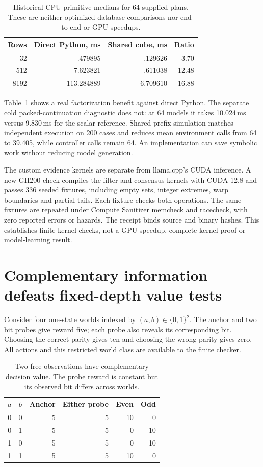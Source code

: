 \documentclass[10pt,twocolumn]{article}
\begin{document}
\begin{table}[t]
\centering\small
\begin{tabular}{rrrr}
\toprule
Rows & Direct Python, ms & Shared cube, ms & Ratio\\
\midrule
32 & .479895 & .129626 & 3.70\\
512 & 7.623821 & .611038 & 12.48\\
8192 & 113.284889 & 6.709610 & 16.88\\
\bottomrule
\end{tabular}
\caption{Historical CPU primitive medians for 64 supplied plans. These are
neither optimized-database comparisons nor end-to-end or GPU speedups.}
\label{tab:cube}
\end{table}

Table~\ref{tab:cube} shows a real factorization benefit against direct Python.
The separate cold packed-continuation diagnostic does not: at 64 models it
takes 10.024\,ms versus 9.830\,ms for the scalar reference. Shared-prefix
simulation matches independent execution on 200 cases and reduces mean
environment calls from 64 to 39.405, while controller calls remain 64.
An implementation can save symbolic work without reducing model generation.

The custom evidence kernels are separate from llama.cpp's CUDA inference.
A new GH200 check compiles the filter and consensus kernels with CUDA 12.8 and
passes 336 seeded fixtures, including empty sets, integer extremes, warp
boundaries and partial tails. Each fixture checks both operations. The same
fixtures are repeated under Compute Sanitizer memcheck and racecheck, with zero
reported errors or hazards. The receipt
 binds source and binary hashes.
This establishes finite kernel checks, not a GPU speedup, complete kernel proof
or model-learning result.

\section{Complementary information defeats fixed-depth value tests}
Consider four one-state worlds indexed by $(a,b)\in\{0,1\}^2$. The anchor and
two bit probes give reward five; each probe also reveals its corresponding bit.
Choosing the correct parity gives ten and choosing the wrong parity gives zero.
All actions and this restricted world class are available to the finite checker.

\begin{table}[t]
\centering\small
\begin{tabular}{ccrrrr}
\toprule
$a$ & $b$ & Anchor & Either probe & Even & Odd\\
\midrule
0 & 0 & 5 & 5 & 10 & 0\\
0 & 1 & 5 & 5 & 0 & 10\\
1 & 0 & 5 & 5 & 0 & 10\\
1 & 1 & 5 & 5 & 10 & 0\\
\bottomrule
\end{tabular}
\caption{Two free observations have complementary decision value. The probe
reward is constant but its observed bit differs across worlds.}
\end{table}
\end{document}
